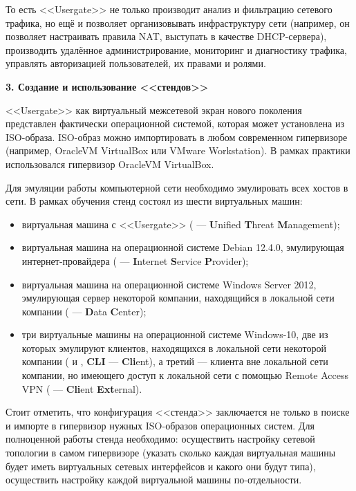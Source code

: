 То есть <<Usergate>> не только производит анализ и фильтрацию сетевого трафика, но ещё и позволяет организовывать инфраструктуру сети (например, он позволяет настраивать правила NAT, выступать в качестве DHCP-сервера), производить удалённое администрирование, мониторинг и диагностику трафика, управлять авторизацией пользователей, их правами и ролями.

\newpage

\begin{center}
	\textbf{\Large 3. Создание и использование <<стендов>>}
\end{center}

<<Usergate>> как виртуальный межсетевой экран нового поколения представлен фактически операционной системой, которая может установлена из ISO-образа. ISO-образ можно импортировать в любом современном гипервизоре (например, OracleVM VirtualBox или VMware Workstation). В рамках практики использовался гипервизор OracleVM VirtualBox.
		
Для эмуляции работы компьютерной сети необходимо эмулировать всех хостов в сети. В рамках обучения стенд состоял из шести виртуальных машин:
		
\begin{itemize}
	\item виртуальная машина с <<Usergate>> (\UTM{} --- \textbf{U}nified \textbf{T}hreat \textbf{M}anagement);
			
	\item виртуальная машина на операционной системе Debian 12.4.0, эмулирующая интернет-провайдера (\ISP{} --- \textbf{I}nternet \textbf{S}ervice \textbf{P}rovider);
			
	\item виртуальная машина на операционной системе Windows Server 2012, эмулирующая сервер некоторой компании, находящийся в локальной сети компании (\DC{} --- \textbf{D}ata \textbf{C}enter);
			
	\item три виртуальные машины на операционной системе Windows-10, две из которых эмулируют клиентов, находящихся в локальной сети некоторой компании (\CLIA{} и \CLIB{}, \textbf{CLI} --- \textbf{Cli}ent), а третий --- клиента вне локальной сети компании, но имеющего доступ к локальной сети с помощью Remote Access VPN (\CLIEXT{} --- \textbf{Cli}ent \textbf{Ext}ernal).
\end{itemize}
		
Стоит отметить, что конфигурация <<стенда>> заключается не только в поиске и импорте в гипервизор нужных ISO-образов операционных систем. Для полноценной работы стенда необходимо: осуществить настройку сетевой топологии в самом гипервизоре (указать сколько каждая виртуальная машины будет иметь виртуальных сетевых интерфейсов и какого они будут типа), осуществить настройку каждой виртуальной машины по-отдельности. 
		

